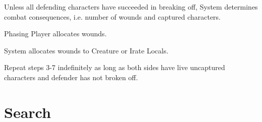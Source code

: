 \documentclass[12pt,letterpaper]{scrreprt}
\begin{document}
\begin{usecase}
{\begin{enumerate}
				\end{enumerate}
			\item Unless all defending characters have succeeded in breaking off, System determines combat consequences, i.e. number of wounds and captured characters.
			\item Phasing Player allocates wounds.
			\item System allocates wounds to Creature or Irate Locals.
			\item Repeat steps 3-7 indefinitely as long as both sides have live uncaptured characters and defender has not broken off.
		}
		\end{usecase}	
	\section{Search}
\end{document}
